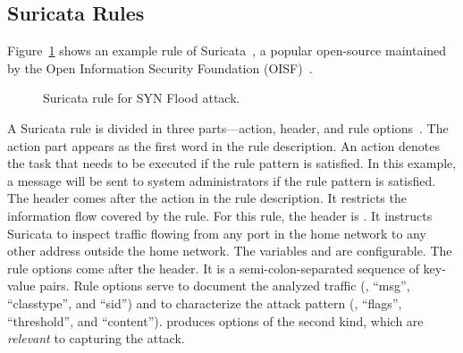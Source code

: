 \documentclass[sigconf,review, anonymous]{acmart}
\begin{document}
\subsection{Suricata Rules}
\label{sec:example-suricata-rules}

Figure~\ref{fig:synflood-example} shows an example rule of
Suricata~\cite{suricata}, a popular open-source \nids{} maintained by
the Open Information Security Foundation (OISF)~\cite{oisf}. 

\vspace{-1ex}
\begin{figure}[h!]
  
  \vspace{-2ex}
  \caption{Suricata rule for SYN Flood attack.}
  \label{fig:synflood-example}
\end{figure}
\vspace{-2ex}

A
Suricata rule is divided in three parts---action, header, and rule
options~\cite{suri-rule-format}. The action part appears as the first
word in the rule description. An action denotes the task that needs to
be executed if the rule pattern is satisfied.
In this example, a
message will be sent to system administrators if the rule pattern is
satisfied. The header comes after the action in the rule
description. It restricts the information flow covered by the
rule. For this rule, the header is . It instructs Suricata to inspect 
traffic flowing from any port in the home network to any other address
outside the home network. The variables  and
 are configurable. The rule options come after
the header. It is a semi-colon-separated sequence of key-value
pairs. Rule options serve to document the analyzed traffic (\eg{},
``msg'', ``classtype'', and ``sid'') and to characterize the attack
pattern (\eg, ``flags'', ``threshold'', and ``content''). \tname{}
produces options of the second kind, which are \emph{relevant} to
capturing the attack.
\end{document}
